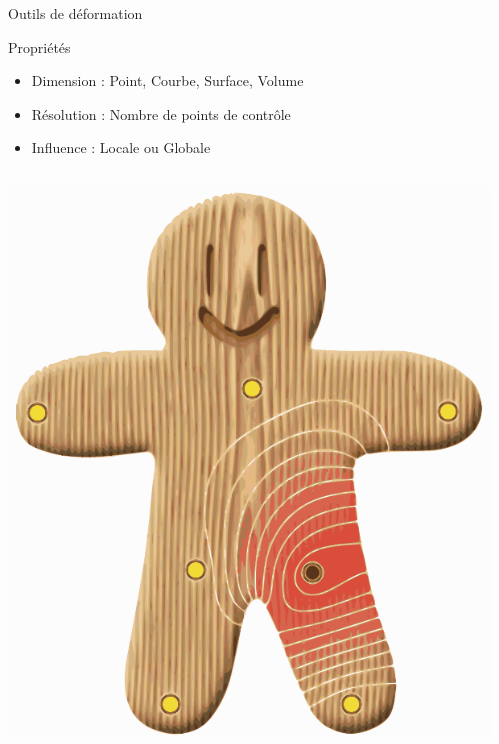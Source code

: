 \documentclass[xcolor=x11names,compress]{beamer}
\renewcommand{\(}{\begin{columns}} \renewcommand{\)}{\end{columns}}
\newcommand{\<}[1]{\begin{column}{#1}} \renewcommand{\>}{\end{column}}
\begin{document}
\begin{frame}{Outils de déformation}
  \begin{exampleblock}{Propriétés}
    \begin{itemize}
      \item Dimension : Point, Courbe, Surface, Volume
      \item Résolution : Nombre de points de contrôle
      \item Influence : Locale ou Globale
    \end{itemize}
  \end{exampleblock}
  \centering
  \begin{columns}[t]
    \begin{column}{0.3\textwidth}
    \centering
      \includegraphics[scale=0.25]{Bounded-InfluenceLocale}
    \end{column}
    \begin{column}{0.3\textwidth}
    \centering

\end{column}
\end{columns}
\end{frame}
\end{document}
